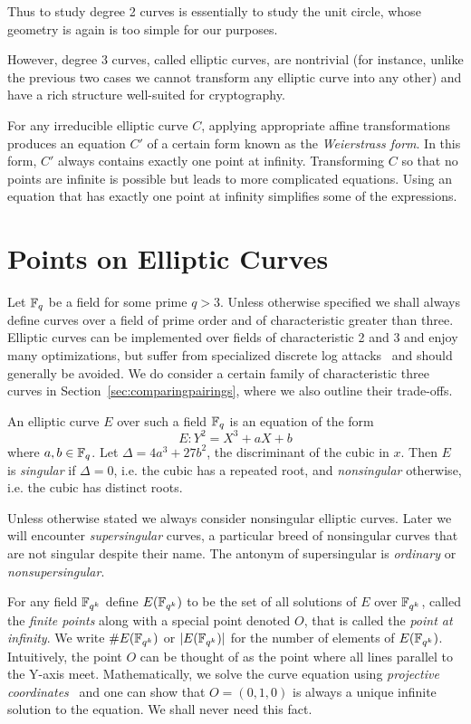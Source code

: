 Thus to study degree 2 curves is essentially to study the unit circle,
whose geometry is again is too simple for our purposes.

However, degree 3 curves, called elliptic curves,
are nontrivial (for instance, unlike the previous two
cases we cannot transform any elliptic curve into
any other)
and have a rich structure well-suited for cryptography.

For any irreducible elliptic curve $C$,
applying appropriate affine transformations
produces an equation $C'$ of a certain form known
as the \emph{Weierstrass form}.
In this form, $C'$ always contains exactly one point at infinity.
Transforming $C$ so
that no points are infinite is
possible but leads to more complicated
equations. Using an equation that has
exactly one point at infinity simplifies some of the expressions.

\section {Points on Elliptic Curves}

Let $\mathbb{F}_q$ be a field for some prime $q > 3$.
Unless otherwise specified we shall always
define curves over a field of prime order and of characteristic greater
than three.
Elliptic curves can be implemented over fields of characteristic 2 and 3
and enjoy many optimizations,
but suffer from specialized discrete log attacks~\cite{coppersmith}
and should generally be avoided. We do consider a certain family of
characteristic three curves in Section~\ref{sec:comparingpairings}, where
we also outline their trade-offs.

An elliptic curve $E$ over such a field $\mathbb{F}_q$ is an equation of the form
\[ E: Y^2 = X^3 + a X + b \]
where $a, b \in \mathbb{F}_q$.
Let $\Delta = 4 a^3 + 27b^2$, the discriminant of the cubic in $x$. Then
$E$ is \emph{singular} if $\Delta = 0$, i.e. the cubic has a repeated root,
and \emph{nonsingular} otherwise, i.e. the cubic has distinct roots.

Unless otherwise stated we always consider nonsingular elliptic curves.
Later we will encounter \emph{supersingular} curves, a particular
breed of nonsingular curves that are not singular despite their name.
The antonym of supersingular is \emph{ordinary} or \emph{nonsupersingular}.

For any field $\mathbb{F}_{q^k}$ define $E(\mathbb{F}_{q^k})$
to be the set of all solutions
of $E$ over $\mathbb{F}_{q^k}$, called the \emph{finite points}
along with a special point denoted $O$,
that is called the \emph{point at infinity}. We write $\#E(\mathbb{F}_{q^k})$ 
or $|E(\mathbb{F}_{q^k})|$ for
the number of elements of $E(\mathbb{F}_{q^k})$.
Intuitively,
the point $O$ can be thought of as the point where all lines
parallel to the Y-axis meet.
Mathematically, we solve the curve equation using
\emph{projective coordinates}~\cite{realprojectiveplane} and
one can show that $O = (0,1,0)$ is always a unique
infinite solution to the equation. We shall never need this fact.

